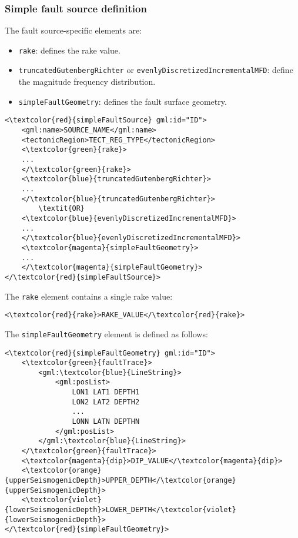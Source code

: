 \subsubsection{Simple fault source definition}
The fault source-specific elements are:
\begin{itemize}
\item \Verb+rake+: defines the rake value.
\item \Verb+truncatedGutenbergRichter+ or \Verb+evenlyDiscretizedIncrementalMFD+: define the magnitude frequency distribution.
\item \Verb+simpleFaultGeometry+: defines the fault surface geometry.
\end{itemize}
\begin{Verbatim}[frame=single, commandchars=\\\{\},fontsize=\normalsize, samepage=true]
<\textcolor{red}{simpleFaultSource} gml:id="ID">
	<gml:name>SOURCE_NAME</gml:name>
	<tectonicRegion>TECT_REG_TYPE</tectonicRegion>
	<\textcolor{green}{rake}>
	...
	</\textcolor{green}{rake}>
	<\textcolor{blue}{truncatedGutenbergRichter}>
	...
	</\textcolor{blue}{truncatedGutenbergRichter}>
		\textit{OR}
	<\textcolor{blue}{evenlyDiscretizedIncrementalMFD}>
	...
	</\textcolor{blue}{evenlyDiscretizedIncrementalMFD}>
	<\textcolor{magenta}{simpleFaultGeometry}>
	...
	</\textcolor{magenta}{simpleFaultGeometry}>
</\textcolor{red}{simpleFaultSource}>
\end{Verbatim}
The \Verb+rake+ element contains a single rake value:
\begin{Verbatim}[frame=single, commandchars=\\\{\},fontsize=\normalsize, samepage=true]
<\textcolor{red}{rake}>RAKE_VALUE</\textcolor{red}{rake}>
\end{Verbatim}
The \Verb+simpleFaultGeometry+ element is defined as follows:
\begin{Verbatim}[frame=single, commandchars=\\\{\},fontsize=\normalsize, samepage=true]
<\textcolor{red}{simpleFaultGeometry} gml:id="ID">
	<\textcolor{green}{faultTrace}>
		<gml:\textcolor{blue}{LineString}>
			<gml:posList>
				LON1 LAT1 DEPTH1
				LON2 LAT2 DEPTH2
				...
				LONN LATN DEPTHN
			</gml:posList>
		</gml:\textcolor{blue}{LineString}>
	</\textcolor{green}{faultTrace}>
	<\textcolor{magenta}{dip}>DIP_VALUE</\textcolor{magenta}{dip}>
	<\textcolor{orange}{upperSeismogenicDepth}>UPPER_DEPTH</\textcolor{orange}{upperSeismogenicDepth}>
	<\textcolor{violet}{lowerSeismogenicDepth}>LOWER_DEPTH</\textcolor{violet}{lowerSeismogenicDepth}>
</\textcolor{red}{simpleFaultGeometry}>
\end{Verbatim}
